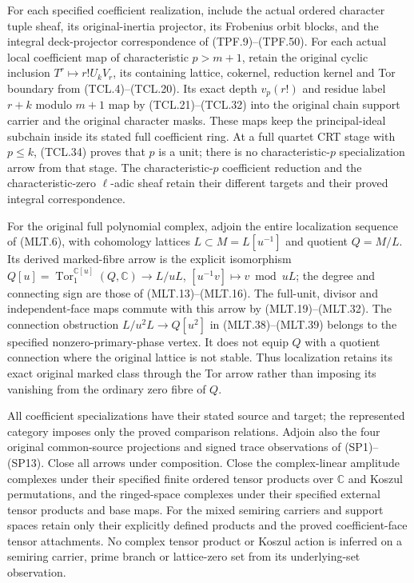 For each specified coefficient realization, include the
actual ordered character tuple sheaf, its original-inertia
projector, its Frobenius orbit blocks, and the integral
deck-projector correspondence of (TPF.9)--(TPF.50).
For each actual local coefficient map of characteristic
$p>m+1$, retain the original cyclic inclusion
$T^r\mapsto r!U_kV_r$, its containing lattice, cokernel,
reduction kernel and Tor boundary from (TCL.4)--(TCL.20).
Its exact depth $v_p(r!)$ and residue label $r+k$ modulo
$m+1$ map by (TCL.21)--(TCL.32) into the original chain
support carrier and the original character masks.
These maps keep the principal-ideal subchain inside its
stated full coefficient ring. At a full quartet CRT stage
with $p\le k$, (TCL.34) proves that $p$ is a unit;
there is no characteristic-$p$ specialization arrow from
that stage. The characteristic-$p$ coefficient reduction
and the characteristic-zero $\ell$-adic sheaf retain their
different targets and their proved integral correspondence.

For the original full polynomial complex, adjoin the entire
localization sequence of (MLT.6), with cohomology lattices
$L\subset M=L[u^{-1}]$ and quotient $Q=M/L$. Its derived
marked-fibre arrow is the explicit isomorphism
$Q[u]=\operatorname{Tor}_1^{\mathbb C[u]}(Q,\mathbb C)
\to L/uL$, $[u^{-1}v]\mapsto v\bmod uL$;
the degree and connecting sign are those of (MLT.13)--(MLT.16).
The full-unit, divisor and independent-face maps commute with
this arrow by (MLT.19)--(MLT.32). The connection obstruction
$L/u^2L\to Q[u^2]$ in (MLT.38)--(MLT.39) belongs to the
specified nonzero-primary-phase vertex. It does not equip
$Q$ with a quotient connection where the original lattice
is not stable. Thus localization retains its exact original
marked class through the Tor arrow rather than imposing
its vanishing from the ordinary zero fibre of $Q$.

All coefficient specializations have their stated source and
target; the represented category imposes only the proved
comparison relations. Adjoin also the four original common-source
projections and signed trace observations of (SP1)--(SP13).
Close all arrows under composition. Close the complex-linear amplitude
complexes under their specified finite ordered tensor products over
$\mathbb C$ and Koszul permutations, and the ringed-space complexes
under their specified external tensor products and base maps.
For the mixed semiring carriers and support spaces retain only their
explicitly defined products and the proved coefficient-face tensor
attachments. No complex tensor product or Koszul action is inferred
on a semiring carrier, prime branch or lattice-zero set from its
underlying-set observation.

